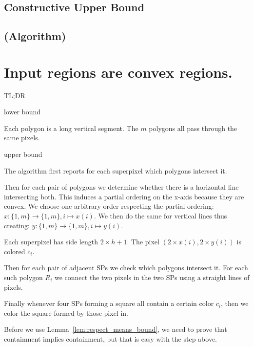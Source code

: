 \documentclass[a4paper, UKenglish]{lipics-v2018}
\begin{document}

\subsection{Constructive Upper Bound}
\label{sub:fat_upper}




\subsection{(Algorithm)}
\label{sub:fat_algo}






\section{Input regions are convex regions.}
\label{sec:convex}

TL;DR

lower bound

Each polygon is a long vertical segment. The $m$ polygons all pass through the same pixels.

upper bound

The algorithm first reports for each superpixel which  polygons intersect it.

Then for each pair of polygons we determine whether there is a horizontal line intersecting both. This induces a partial ordering on the x-axis because they are convex.
We choose one arbitrary order respecting the partial ordering: $x: \{1, m\}\to \{1, m\}, i\mapsto x(i)$.
We then do the same for vertical lines thus creating: $y: \{1, m\}\to \{1, m\}, i\mapsto y(i)$.

Each superpixel has side length $2\times h+1$. The pixel $(2\times x(i), 2\times y(i))$ is colored $c_i$.

Then for each pair of adjacent SPs we check which polygons intersect it. For each such polygon $R_i$ we connect the two pixels in the two SPs using a straight lines of pixels.

Finally whenever four SPs forming a square all contain a certain color $c_i$, then we color the square formed by those pixel in.

Before we use Lemma~\ref{lem:respect_means_bound}, we need to prove that containment implies containment, but that is easy with the step above.
\end{document}
